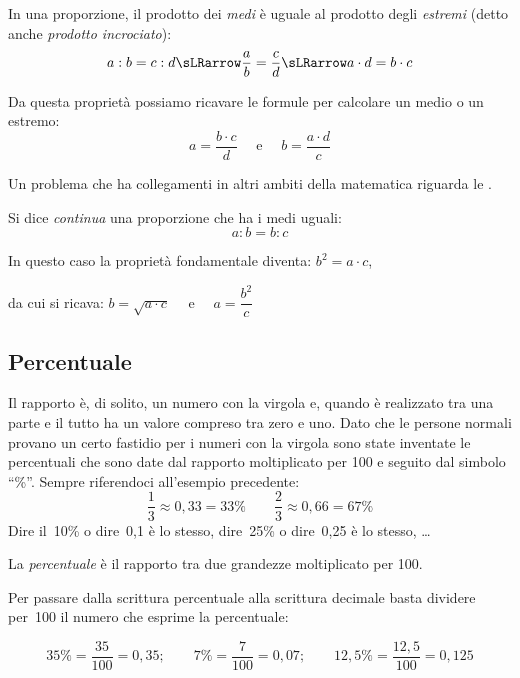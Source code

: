 \begin{teorema}{}{}
In una proporzione, il prodotto dei \emph{medi} è uguale al prodotto 
degli \emph{estremi} (detto anche \emph{prodotto incrociato}):
\[a:b=c:d \sLRarrow \dfrac{a}{b} = \dfrac{c}{d} \sLRarrow 
a \cdot d = b \cdot c\]
\end{teorema}

Da questa proprietà possiamo ricavare le formule per calcolare un medio 
o un estremo:
\[a = \frac{b \cdot c}{d} \quad \text{ e } \quad 
  b = \frac{a \cdot d}{c}\]

Un problema che ha collegamenti in altri ambiti della matematica 
riguarda le .

\begin{definizione}{}{}
 Si dice \emph{continua} una proporzione che ha i medi uguali:
 \[a : b = b : c\]
\end{definizione}

In questo caso la proprietà fondamentale diventa: \qquad
\(b^2 = a \cdot c\),

da cui si ricava: \qquad
\(b = \sqrt{a \cdot c} \quad \text{ e } \quad a = \dfrac{b^2}{c}\)

\subsection{Percentuale}

Il rapporto è, di solito, un numero con la virgola e, quando è 
realizzato tra una parte e il tutto ha un valore compreso tra 
zero e uno. 
Dato che le persone normali provano un certo fastidio per i numeri con 
la virgola sono state inventate le percentuali che sono date dal 
rapporto moltiplicato per 100 e seguito dal simbolo ``\%''. 
Sempre riferendoci all'esempio precedente:
\[\frac{1}{3} \approx 0,33 = 33\% \qquad 
  \frac{2}{3} \approx 0,66 = 67\%\]
Dire il~10\% o dire~0,1 è lo stesso, 
dire~25\% o dire~0,25 è lo stesso, \dots

\begin{definizione}{}{}
 La \emph{percentuale} è il rapporto tra due grandezze moltiplicato per 
100.
\end{definizione}


Per passare dalla scrittura percentuale alla scrittura decimale basta 
dividere per~100 il numero che esprime la percentuale:

\vspace{-.5em}
\[35\% = \frac{35}{100} = 0,35;\qquad
  7\% = \frac{7}{100} = 0,07; \qquad 
12,5\% = \frac{12,5}{100} = 0,125\]

